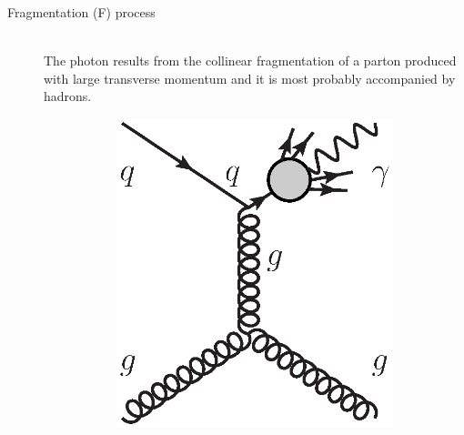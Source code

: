\documentclass[12pt, twoside]{article}
\numberwithin{equation}{section}
\numberwithin{figure}{section}
\begin{document}
\begin{description}
    \vspace{0.2cm}
    \item[Fragmentation (F) process] \hfil \\
    The photon results from the collinear fragmentation of a parton produced with large transverse momentum and it is most probably accompanied by hadrons.
    \begin{figure}[h]
        \centering
        \begin{subfigure}[b]{0.25\textwidth}
            \includegraphics[width=\textwidth]{./images/F_LO_Feynman.eps}
            \caption{}
            \label{fig:F_LO_Feynman}
        \end{subfigure}
        \hspace{1.0cm}
        \begin{subfigure}[b]{0.25\textwidth}

\end{subfigure}
\end{figure}
\end{description}
\end{document}
